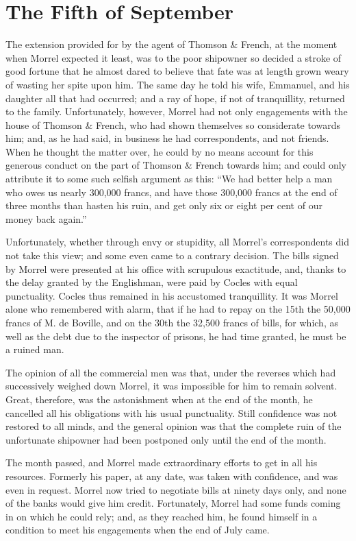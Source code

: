\chapter{The Fifth of September}

The extension provided for by the agent of Thomson \& French, at the
moment when Morrel expected it least, was to the poor shipowner so
decided a stroke of good fortune that he almost dared to believe that
fate was at length grown weary of wasting her spite upon him. The same
day he told his wife, Emmanuel, and his daughter all that had occurred;
and a ray of hope, if not of tranquillity, returned to the family.
Unfortunately, however, Morrel had not only engagements with the house
of Thomson \& French, who had shown themselves so considerate towards
him; and, as he had said, in business he had correspondents, and not
friends. When he thought the matter over, he could by no means account
for this generous conduct on the part of Thomson \& French towards him;
and could only attribute it to some such selfish argument as this: “We
had better help a man who owes us nearly 300,000 francs, and have those
300,000 francs at the end of three months than hasten his ruin, and get
only six or eight per cent of our money back again.”

Unfortunately, whether through envy or stupidity, all Morrel’s
correspondents did not take this view; and some even came to a contrary
decision. The bills signed by Morrel were presented at his office with
scrupulous exactitude, and, thanks to the delay granted by the
Englishman, were paid by Cocles with equal punctuality. Cocles thus
remained in his accustomed tranquillity. It was Morrel alone who
remembered with alarm, that if he had to repay on the 15th the 50,000
francs of M. de Boville, and on the 30th the 32,500 francs of bills,
for which, as well as the debt due to the inspector of prisons, he had
time granted, he must be a ruined man.

The opinion of all the commercial men was that, under the reverses
which had successively weighed down Morrel, it was impossible for him
to remain solvent. Great, therefore, was the astonishment when at the
end of the month, he cancelled all his obligations with his usual
punctuality. Still confidence was not restored to all minds, and the
general opinion was that the complete ruin of the unfortunate shipowner
had been postponed only until the end of the month.

The month passed, and Morrel made extraordinary efforts to get in all
his resources. Formerly his paper, at any date, was taken with
confidence, and was even in request. Morrel now tried to negotiate
bills at ninety days only, and none of the banks would give him credit.
Fortunately, Morrel had some funds coming in on which he could rely;
and, as they reached him, he found himself in a condition to meet his
engagements when the end of July came.

